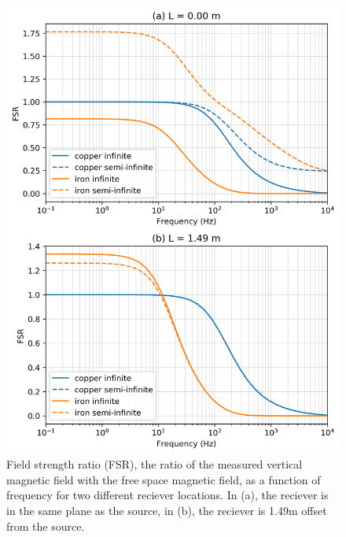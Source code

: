 \begin{figure}
    \begin{center}
    \includegraphics[width=0.6\columnwidth]{figures/casing_software/AugustinFSR.png}
    \end{center}
\caption{
    Field strength ratio (FSR), the ratio of the measured vertical magnetic field with the free space magnetic field, as a function of frequency for two different reciever locations.
    In (a), the reciever is in the same plane as the source, in (b), the reciever is 1.49m offset from the source.
}
\label{fig:AugustinFSR}
\end{figure}
